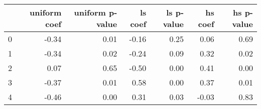\begin{tabular}{lrrrrrr}
\toprule
 & uniform coef & uniform p-value & ls coef & ls p-value & hs coef & hs p-value \\
\midrule
0 & -0.34 & 0.01 & -0.16 & 0.25 & 0.06 & 0.69 \\
1 & -0.34 & 0.02 & -0.24 & 0.09 & 0.32 & 0.02 \\
2 & 0.07 & 0.65 & -0.50 & 0.00 & 0.41 & 0.00 \\
3 & -0.37 & 0.01 & 0.58 & 0.00 & 0.37 & 0.01 \\
4 & -0.46 & 0.00 & 0.31 & 0.03 & -0.03 & 0.83 \\
\bottomrule
\end{tabular}
